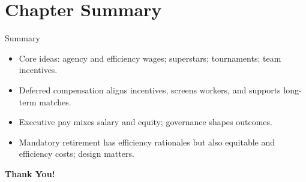 \documentclass[aspectratio=169]{beamer}
\begin{document}
\section{Chapter Summary}

\begin{frame}{Summary}
\transfade
\begin{itemize}[<+->]
  \item Core ideas: agency and efficiency wages; superstars; tournaments; team incentives.
  \item Deferred compensation aligns incentives, screens workers, and supports long-term matches.
  \item Executive pay mixes salary and equity; governance shapes outcomes.
  \item Mandatory retirement has efficiency rationales but also equitable and efficiency costs; design matters.
\end{itemize}
\end{frame}

\begin{frame}
\centering
\Huge{\textbf{Thank You!}} \\
\end{frame}
\end{document}

